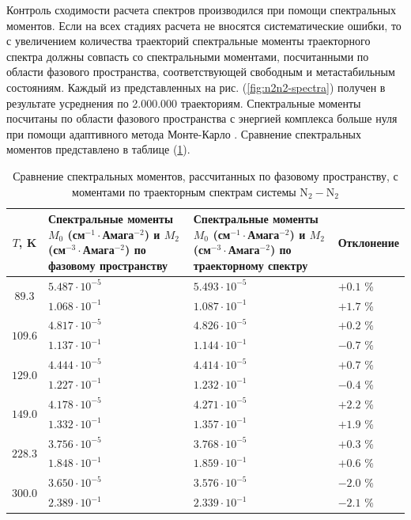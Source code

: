 Контроль сходимости расчета спектров производился при помощи спектральных моментов. Если на всех стадиях расчета не вносятся систематические ошибки, то с увеличением количества траекторий спектральные моменты траекторного спектра должны совпасть со спектральными моментами, посчитанными по области фазового пространства, соответствующей свободным и метастабильным состояниям. Каждый из представленных на рис. (\ref{fig:n2n2-spectra}) получен в результате усреднения по 2.000.000 траекториям. Спектральные моменты посчитаны по области фазового пространства с энергией комплекса больше нуля при помощи адаптивного метода Монте-Карло \cite{hep}. Сравнение спектральных моментов представлено в таблице (\ref{table:n2n2-moments}).

\begin{table}[H]
    \caption{Сравнение спектральных моментов, рассчитанных по фазовому пространству, с моментами по траекторным спектрам системы N$_2-$N$_2$}
    \begin{tabular}{c >{\centering}p{6cm} >{\centering}p{6cm} >{\centering}p{3cm}}
        \toprule
        $T$, K & Спектральные моменты $M_0$ (см$^{-1} \cdot$Амага$^{-2}$) и $M_2$ (см$^{-3} \cdot$Амага$^{-2}$) по фазовому пространству & Спектральные моменты $M_0$ (см$^{-1} \cdot$Амага$^{-2}$) и $M_2$ (см$^{-3} \cdot$Амага$^{-2}$) по траекторному спектру & Отклонение \tabularnewline
        \midrule
        \multirow{2}{*}{$89.3$}  & $5.487\cdot 10^{-5}$ & $5.493 \cdot 10^{-5}$ & $+0.1$ \%  \tabularnewline
                                 & $1.068\cdot 10^{-1}$ & $1.087 \cdot 10^{-1}$ & $+1.7$ \%  \tabularnewline
        \midrule
        \multirow{2}{*}{$109.6$} & $4.817\cdot 10^{-5}$ & $4.826 \cdot 10^{-5}$ & $+0.2$ \%  \tabularnewline
                                 & $1.137\cdot 10^{-1}$ & $1.144 \cdot 10^{-1}$ & $-0.7$ \%  \tabularnewline
        \midrule
        \multirow{2}{*}{$129.0$} & $4.444\cdot 10^{-5}$ & $4.414 \cdot 10^{-5}$ & $+0.7$ \%  \tabularnewline
                                 & $1.227\cdot 10^{-1}$ & $1.232 \cdot 10^{-1}$ & $-0.4$ \%  \tabularnewline
        \midrule
        \multirow{2}{*}{$149.0$} & $4.178\cdot 10^{-5}$ & $4.271 \cdot 10^{-5}$ & $+2.2$ \%  \tabularnewline
                                 & $1.332\cdot 10^{-1}$ & $1.357 \cdot 10^{-1}$ & $+1.9$ \%  \tabularnewline
        \midrule
        \multirow{2}{*}{$228.3$} & $3.756\cdot 10^{-5}$ & $3.768 \cdot 10^{-5}$ & $+0.3$ \%  \tabularnewline
                                 & $1.848\cdot 10^{-1}$ & $1.859 \cdot 10^{-1}$ & $+0.6$ \%  \tabularnewline
        \midrule
        \multirow{2}{*}{$300.0$} & $3.650\cdot 10^{-5}$ & $3.576 \cdot 10^{-5}$ & $-2.0$ \%  \tabularnewline
                                 & $2.389\cdot 10^{-1}$ & $2.339 \cdot 10^{-1}$ & $-2.1$ \%  \tabularnewline
        \bottomrule
    \end{tabular}
    \label{table:n2n2-moments}
\end{table}

